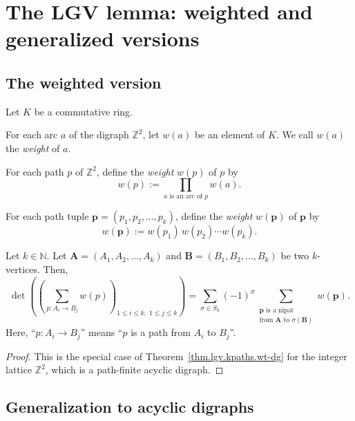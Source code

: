 \section{The LGV lemma: weighted and generalized versions}

\subsection{The weighted version}

\begin{theorem}
\label{thm.lgv.kpaths.wt}
\leantarget
\leanok
Let $K$ be a commutative ring.

For each arc $a$ of the digraph $\mathbb{Z}^{2}$, let $w(a)$ be
an element of $K$. We call $w(a)$ the \emph{weight} of $a$.

For each path $p$ of $\mathbb{Z}^{2}$, define the \emph{weight} $w(p)$
of $p$ by
\[
  w(p) := \prod_{a \text{ is an arc of } p} w(a).
\]

For each path tuple $\mathbf{p} = (p_1, p_2, \ldots, p_k)$, define the
\emph{weight} $w(\mathbf{p})$ of $\mathbf{p}$ by
\[
  w(\mathbf{p}) := w(p_1)\, w(p_2) \cdots w(p_k).
\]

Let $k \in \mathbb{N}$.  Let
$\mathbf{A} = (A_1, A_2, \ldots, A_k)$ and
$\mathbf{B} = (B_1, B_2, \ldots, B_k)$ be two $k$-vertices.  Then,
\[
  \det\!\left(\left(\sum_{p : A_i \to B_j} w(p)\right)_{1 \le i \le k,\; 1 \le j \le k}\right)
  = \sum_{\sigma \in S_k} (-1)^{\sigma}
    \sum_{\substack{\mathbf{p} \text{ is a nipat} \\ \text{from } \mathbf{A} \text{ to } \sigma(\mathbf{B})}}
    w(\mathbf{p}).
\]
Here, ``$p : A_i \to B_j$'' means ``$p$ is a path from $A_i$ to $B_j$''.
\end{theorem}

\begin{proof}
This is the special case of Theorem~\ref{thm.lgv.kpaths.wt-dg} for the
integer lattice $\mathbb{Z}^2$, which is a path-finite acyclic digraph.
\end{proof}

\subsection{Generalization to acyclic digraphs}

